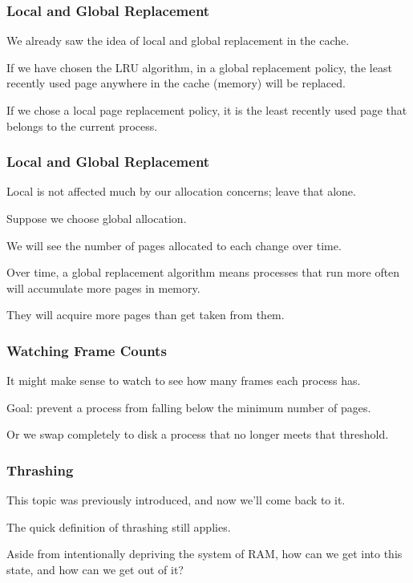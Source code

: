 \begin{frame}
\frametitle{Local and Global Replacement}

We already saw the idea of local and global replacement in the cache. 

If we have chosen the LRU algorithm, in a global replacement policy, the least recently used page anywhere in the cache (memory) will be replaced. 

If we chose a local page replacement policy, it is the least recently used page that belongs to the current process.

\end{frame}

\begin{frame}
\frametitle{Local and Global Replacement}

Local is not affected much by our allocation concerns; leave that alone. 

Suppose we choose global allocation. 

We will see the number of pages allocated to each change over time. 

Over time, a global replacement algorithm means processes that run more often will accumulate more pages in memory.

They will acquire more pages than get taken from them.

\end{frame}

\begin{frame}
\frametitle{Watching Frame Counts}

It might make sense to watch to see how many frames each process has. 

Goal: prevent a process from falling below the minimum number of pages.

Or we swap completely to disk a process that no longer meets that threshold.


\end{frame}

\begin{frame}
\frametitle{Thrashing}
This topic was previously introduced, and now we'll come back to it.

The quick definition of thrashing still applies.

Aside from intentionally depriving the system of RAM, how can we get into this state, and how can we get out of it?


\end{frame}

